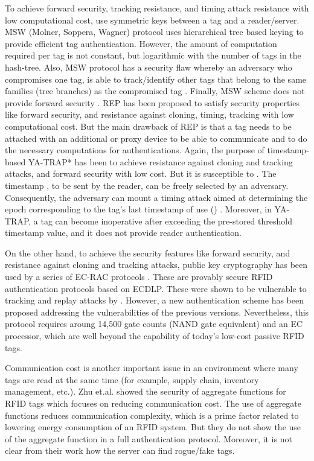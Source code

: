 \documentclass{easychair}
\begin{document}
To achieve forward security, 
tracking resistance, and timing attack resistance with low computational cost, \cite{rep, molner, Tsudik} use symmetric keys between a tag and a reader/server. MSW (Molner, Soppera, Wagner) protocol \cite{molner} 
uses hierarchical tree based keying to provide efficient tag authentication. However, the amount of
computation required per tag is not constant, but logarithmic
with the number of tags in the hash-tree. Also, MSW protocol has a security flaw whereby an adversary who 
compromises one tag, is able to track/identify other tags that belong to the 
same families
(tree branches) as the compromised tag \cite{avoine}. Finally, MSW scheme does not provide forward security \cite{burmester1}. REP \cite{rep} has been proposed to satisfy security 
properties like forward security, and  resistance against cloning, timing, tracking with low computational cost. But the main drawback of REP is that a tag needs to be attached with an 
additional or proxy device to be able to communicate and to do the necessary computations for authentications. 
Again, the purpose of timestamp-based YA-TRAP* \cite{Tsudik} has been to achieve resistance against cloning and tracking attacks, and forward security with low cost. 
But it is susceptible to  . 
The timestamp , to be sent by the reader, can be freely selected by an adversary. Consequently, the 
adversary can mount a timing attack aimed at determining the epoch corresponding 
to the tag's last timestamp of use () \cite{Tsudik}. Moreover, in YA-TRAP, a tag can become 
inoperative after exceeding the pre-stored threshold timestamp value, and it does not provide reader authentication.

On the other hand, to achieve the security features like forward security, and resistance against cloning and tracking attacks, public key cryptography has been used by a 
series of EC-RAC protocols \cite{ecrac3,ecrac,ecrac2}. These are provably secure RFID authentication protocols based on 
ECDLP. These were shown to be vulnerable to tracking and replay attacks by \cite{Bringer,fan,ton}. However, a new authentication scheme \cite{ecrac4} has been proposed addressing the vulnerabilities of the previous versions. Nevertheless, this protocol requires
 aroung 14,500 gate counts (NAND gate 
equivalent) and an EC processor, which are well beyond the capability of today's low-cost passive RFID tags.

Communication cost is another important issue in an environment where many tags are read at the same time (for example, 
supply chain, inventory management, etc.). Zhu et.al. \cite{zhu} showed the security of aggregate functions for RFID 
tags which focuses on reducing communication cost. 
The use of aggregate functions reduces communication complexity, which is a prime factor related to lowering energy 
consumption of an RFID system. But 
they do not show the use of the aggregate function in a full authentication 
protocol. Moreover, it is not clear from their work how the server can find rogue/fake tags.
\end{document}
